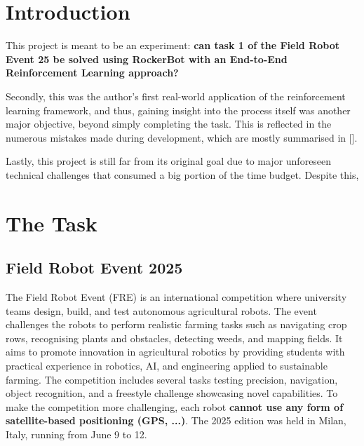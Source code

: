 \documentclass[11pt,a4paper,twocolumn]{article}
\begin{document}




\section{Introduction}
\label{sec:introduction}

This project is meant to be an experiment: \textbf{can task 1 of the Field Robot Event 25 be solved using RockerBot with an End-to-End Reinforcement Learning approach?} 

Secondly, this was the author's first real-world application of the reinforcement learning framework, and thus, gaining insight into the process itself was another major objective, beyond simply completing the task. This is reflected in the numerous mistakes made during development, which are mostly summarised in [].

Lastly, this project is still far from its original goal due to major unforeseen technical challenges that consumed a big portion of the time budget. Despite this, 

\section{The Task}
\label{sec:task}

\subsection{Field Robot Event 2025}
The Field Robot Event (FRE) is an international competition where university teams design, build, and test autonomous agricultural robots. The event challenges the robots to perform realistic farming tasks such as navigating crop rows, recognising plants and obstacles, detecting weeds, and mapping fields. It aims to promote innovation in agricultural robotics by providing students with practical experience in robotics, AI, and engineering applied to sustainable farming. The competition includes several tasks testing precision, navigation, object recognition, and a freestyle challenge showcasing novel capabilities.
To make the competition more challenging, each robot \textbf{cannot use any form of satellite-based positioning (GPS, ...)}.
The 2025 edition was held in Milan, Italy, running from June 9 to 12.
\end{document}
